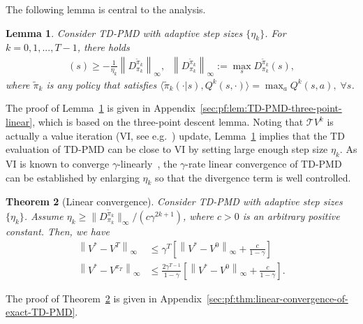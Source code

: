 \documentclass[10pt]{article}
\newcommand{\calT}{\mathcal{T}}
\newcommand{\ls}{\left}
\newcommand{\rs}{\right}
\theoremstyle{plain}
\newtheorem{theorem}{Theorem}[section]
\newtheorem{lemma}[theorem]{Lemma}
\theoremstyle{definition}
\begin{document}
The following lemma is central to the analysis.
\begin{lemma}
Consider TD-PMD with adaptive step sizes $\{\eta_k\}$.    For $k=0,1,...,T-1$, there holds
    \begin{align}
        [\calT^{\pi_{k+1}} V^k - \calT V^k](s) \geq -\frac{1}{\eta_k}\ls\| D_{\pi_k}^{\tilde{\pi}_k} \rs\|_\infty, \;\; \ls\|D_{\pi_k}^{\tilde{\pi}_k} \rs\|_\infty :=\max_s D_{\pi_k}^{\tilde{\pi}_k}(s),
        \label{eq:TD-PMD-three-point-linear}
    \end{align}
    where $\tilde{\pi}_k$ is any policy that satisfies $\langle\tilde{\pi}_k(\cdot|s),Q^k(s,\cdot)\rangle = \max_aQ^{k}(s,a),\;\forall s$.
    \label{lem:TD-PMD-three-point-linear}
\end{lemma}
The proof of Lemma~\ref{lem:TD-PMD-three-point-linear} is given in Appendix~\ref{sec:pf:lem:TD-PMD-three-point-linear}, which is based on the three-point descent lemma. %
Noting that $\calT V^k$ is actually a value iteration (VI, see e.g.~\cite{suttonRL}) update, Lemma~\ref{lem:TD-PMD-three-point-linear} implies that the TD evaluation of TD-PMD can be close to VI by setting large enough step size $\eta_k$. As VI is known to converge $\gamma$-linearly~\cite{suttonRL}, the $\gamma$-rate linear convergence of TD-PMD can be established by enlarging $\eta_k$ so that the divergence term is well controlled. 

\begin{theorem}[Linear convergence]
    Consider  TD-PMD  with adaptive step sizes $\{ \eta_k \}$. Assume $\eta_k \geq {\| D_{\pi_k}^{\tilde{\pi}_k} \|_\infty}/{(c\gamma^{2k+1})}$,
    where $c > 0$ is an arbitrary positive constant. Then, we have
    \begin{align}
        \ls\| V^* - V^T \rs\|_\infty &\leq \gamma^T \ls[ \ls\| V^* - V^0 \rs\|_\infty + \frac{c}{1-\gamma} \rs]
        \label{eq:linear-convergence-of-output-value} \\
        \ls\| V^* - V^{\pi_T} \rs\|_\infty &\leq \frac{2\gamma^{T-1}}{1-\gamma} \ls[ \ls\| V^* - V^0 \rs\|_\infty + \frac{c}{1-\gamma} \rs].
        \label{eq:linear-convergence-of-output-policy}
    \end{align}
    \label{thm:linear-convergence-of-exact-TD-PMD}
\end{theorem}

The proof of Theorem~\ref{thm:linear-convergence-of-exact-TD-PMD} is given in Appendix~\ref{sec:pf:thm:linear-convergence-of-exact-TD-PMD}.
\end{document}
